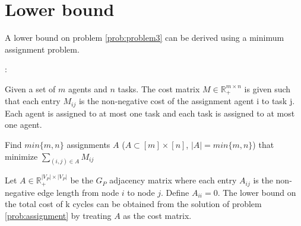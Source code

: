 \section{Lower bound}

A lower bound on problem \ref{prob:problem3} can be derived using a minimum assignment problem. 

\begin{problem}:

Given a set of $m$ agents and $n$ tasks. The cost matrix $M \in \mathbb{R}_+^{m \times n}$ is given such that each entry $M_{ij}$ is the non-negative cost of the assignment agent i to task j. Each agent is assigned to at most one task and each task is assigned to at most one agent.

Find $min\{m, n\}$ assignments $A$ ($A \subset [m] \times [n]$, $|A| = min\{m, n\}$) that minimize $\sum_{(i, j) \in A} M_{ij}$

\label{prob:assignment}
\end{problem}

Let $A \in \mathbb{R}_+^{|V_P| \times |V_P|}$ be the $G_P$ adjacency matrix where each entry $A_{ij}$ is the non-negative edge length from node $i$ to node $j$. Define $A_{ii} = 0$. The lower bound on the total cost of k cycles can be obtained from the solution of problem \ref{prob:assignment} by treating $A$ as the cost matrix.